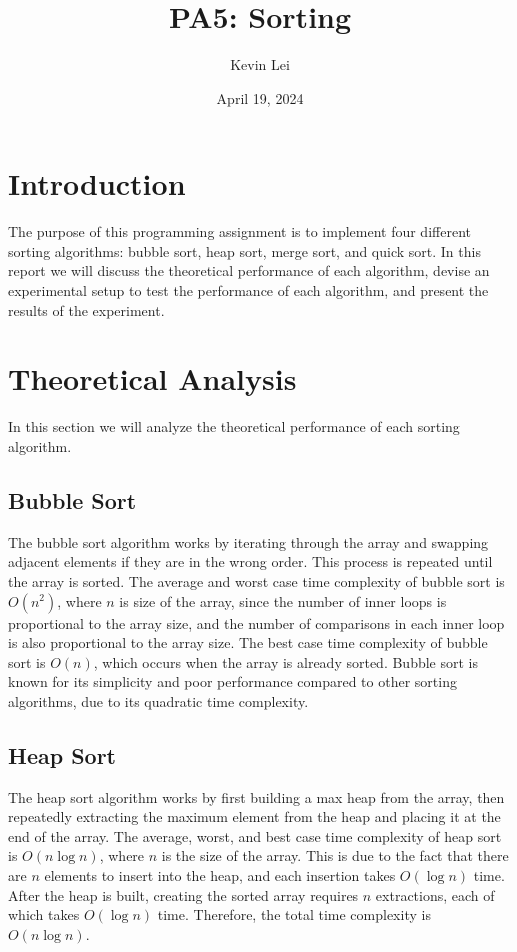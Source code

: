 \documentclass{article}
\title{PA5: Sorting}
\author{Kevin Lei}
\date{April 19, 2024}
\begin{document}
\maketitle

\section{Introduction}
The purpose of this programming assignment is to implement four different sorting algorithms: bubble sort, heap sort, merge sort, and quick sort.
In this report we will discuss the theoretical performance of each algorithm, devise an experimental setup to test the performance of each algorithm, and present the results of the experiment.

\section{Theoretical Analysis}
In this section we will analyze the theoretical performance of each sorting algorithm.

\subsection{Bubble Sort}
The bubble sort algorithm works by iterating through the array and swapping adjacent elements if they are in the wrong order.
This process is repeated until the array is sorted.
The average and worst case time complexity of bubble sort is $O(n^2)$, where $n$ is size of the array, since the number of inner loops is proportional to the array size, and the number of comparisons in each inner loop is also proportional to the array size.
The best case time complexity of bubble sort is $O(n)$, which occurs when the array is already sorted.
Bubble sort is known for its simplicity and poor performance compared to other sorting algorithms, due to its quadratic time complexity.

\subsection{Heap Sort}
The heap sort algorithm works by first building a max heap from the array, then repeatedly extracting the maximum element from the heap and placing it at the end of the array.
The average, worst, and best case time complexity of heap sort is $O(n \log n)$, where $n$ is the size of the array.
This is due to the fact that there are $n$ elements to insert into the heap, and each insertion takes $O(\log n)$ time.
After the heap is built, creating the sorted array requires $n$ extractions, each of which takes $O(\log n)$ time.
Therefore, the total time complexity is $O(n \log n)$.
\end{document}

